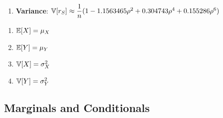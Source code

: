 \begin{enumerate}[series=binvar-normal]
\begin{enumerate}
        \item \textbf{Variance}:
        $
            \mathbb{V}[r_S]
            \approx \dfrac{1}{ n} (1 - 1.1563465\rho^2 + 0.304743\rho^4 + 0.155286\rho^6)
        $
        \hfill \cite{statistics/book/Statistics-for-Data-Scientists/Maurits-Kaptein}
    \end{enumerate}


\end{enumerate}


\begin{multicols}{2}
\begin{enumerate}[resume*=binvar-normal]
    \item $\mathbb{E}[X] = \mu_X$
    \hfill \cite{statistics/book/Statistics-for-Data-Scientists/Maurits-Kaptein}

    \item $\mathbb{E}[Y] = \mu_Y$
    \hfill \cite{statistics/book/Statistics-for-Data-Scientists/Maurits-Kaptein}

    \item $\mathbb{V}[X] = \sigma^2_X$
    \hfill \cite{statistics/book/Statistics-for-Data-Scientists/Maurits-Kaptein}

    \item $\mathbb{V}[Y] = \sigma^2_Y$
    \hfill \cite{statistics/book/Statistics-for-Data-Scientists/Maurits-Kaptein}
\end{enumerate}
\end{multicols}




\subsection{Marginals and Conditionals}

